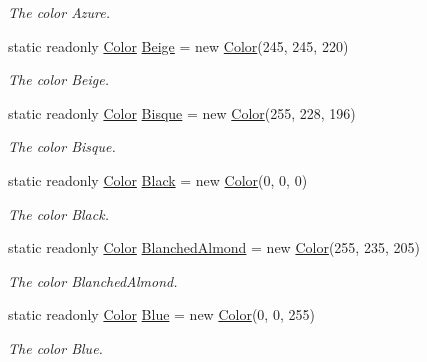 \begin{DoxyCompactItemize}
\begin{DoxyCompactList}\small\item\em The color Azure. \end{DoxyCompactList}\item 
static readonly \hyperlink{struct_tri_devs_1_1_tri_engine2_d_1_1_color}{Color} \hyperlink{struct_tri_devs_1_1_tri_engine2_d_1_1_color_a8398377c9baaab3a7bab92b582c54d5b}{Beige} = new \hyperlink{struct_tri_devs_1_1_tri_engine2_d_1_1_color}{Color}(245, 245, 220)
\begin{DoxyCompactList}\small\item\em The color Beige. \end{DoxyCompactList}\item 
static readonly \hyperlink{struct_tri_devs_1_1_tri_engine2_d_1_1_color}{Color} \hyperlink{struct_tri_devs_1_1_tri_engine2_d_1_1_color_a172f4da22584e3b955f3eb3060517143}{Bisque} = new \hyperlink{struct_tri_devs_1_1_tri_engine2_d_1_1_color}{Color}(255, 228, 196)
\begin{DoxyCompactList}\small\item\em The color Bisque. \end{DoxyCompactList}\item 
static readonly \hyperlink{struct_tri_devs_1_1_tri_engine2_d_1_1_color}{Color} \hyperlink{struct_tri_devs_1_1_tri_engine2_d_1_1_color_a7f40a7f2300ec92cfe41f83839096cd4}{Black} = new \hyperlink{struct_tri_devs_1_1_tri_engine2_d_1_1_color}{Color}(0, 0, 0)
\begin{DoxyCompactList}\small\item\em The color Black. \end{DoxyCompactList}\item 
static readonly \hyperlink{struct_tri_devs_1_1_tri_engine2_d_1_1_color}{Color} \hyperlink{struct_tri_devs_1_1_tri_engine2_d_1_1_color_a7ccf784215d78fc0557889d076252701}{Blanched\-Almond} = new \hyperlink{struct_tri_devs_1_1_tri_engine2_d_1_1_color}{Color}(255, 235, 205)
\begin{DoxyCompactList}\small\item\em The color Blanched\-Almond. \end{DoxyCompactList}\item 
static readonly \hyperlink{struct_tri_devs_1_1_tri_engine2_d_1_1_color}{Color} \hyperlink{struct_tri_devs_1_1_tri_engine2_d_1_1_color_ae83a5b50e83a01a3d31018292c0d0cb4}{Blue} = new \hyperlink{struct_tri_devs_1_1_tri_engine2_d_1_1_color}{Color}(0, 0, 255)
\begin{DoxyCompactList}\small\item\em The color Blue. \end{DoxyCompactList}\item 

\end{DoxyCompactItemize}
